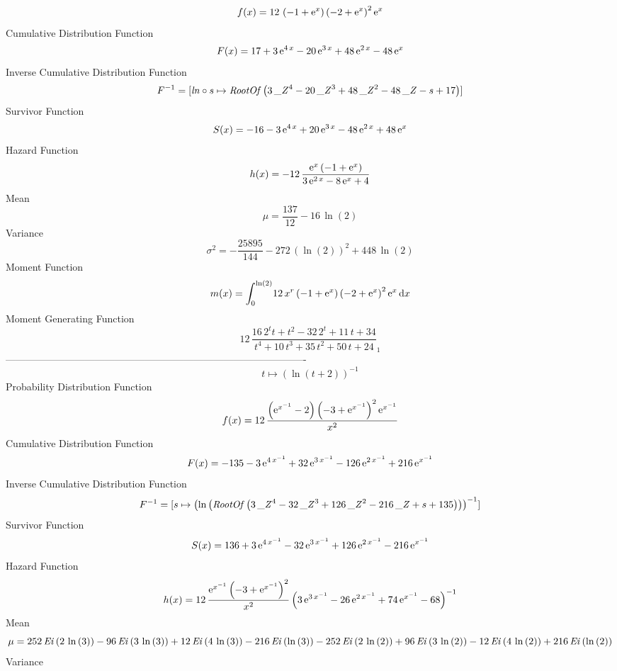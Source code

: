 \documentclass[12pt]{article}
\begin{document}
$$  f(x)=12\, \left( -1+{{\rm e}^{x}} \right)  \left( -2+{{\rm e}^{x}} \right) 
^{2}{{\rm e}^{x}}
$$Cumulative Distribution Function  
 $$F(x)=17+3\,{{\rm e}^{4\,x}}-20\,{{\rm e}^{3\,x}}+48\,{{\rm e}^{2\,x}}-48\,{
{\rm e}^{x}}
$$ Inverse Cumulative Distribution Function 
  $$F^{-1} = [{\it ln}\circ s\mapsto {\it RootOf} \left( 3\,{{\it \_Z}}^{4}-20\,{{
\it \_Z}}^{3}+48\,{{\it \_Z}}^{2}-48\,{\it \_Z}-s+17 \right) ]
$$Survivor Function 
 $$ S(x)=-16-3\,{{\rm e}^{4\,x}}+20\,{{\rm e}^{3\,x}}-48\,{{\rm e}^{2\,x}}+48\,
{{\rm e}^{x}}
$$ Hazard Function 
 $$ h(x)=-12\,{\frac {{{\rm e}^{x}} \left( -1+{{\rm e}^{x}} \right) }{3\,{
{\rm e}^{2\,x}}-8\,{{\rm e}^{x}}+4}}
$$Mean 
 $$ \mu={\frac{137}{12}}-16\,\ln  \left( 2 \right) 
$$ Variance 
 $$ \sigma^2 = -{\frac{25895}{144}}-272\, \left( \ln  \left( 2 \right)  \right) ^{2}+
448\,\ln  \left( 2 \right) 
$$Moment Function 
 $$ m(x) = \int_{0}^{\ln  \left( 2 \right) }\!12\,{x}^{r} \left( -1+{{\rm e}^{x}}
 \right)  \left( -2+{{\rm e}^{x}} \right) ^{2}{{\rm e}^{x}}\,{\rm d}x
$$ Moment Generating Function 
 $$12\,{\frac {16\,{2}^{t}t+{t}^{2}-32\,{2}^{t}+11\,t+34}{{t}^{4}+10\,{t}
^{3}+35\,{t}^{2}+50\,t+24}}_{{1}}
$$-------------------------------------------------------------------------------------------  \\$$t\mapsto  \left( \ln  \left( t+2 \right)  \right) ^{-1}
$$Probability Distribution Function 
$$  f(x)=12\,{\frac { \left( {{\rm e}^{{x}^{-1}}}-2 \right)  \left( -3+{{\rm e}
^{{x}^{-1}}} \right) ^{2}{{\rm e}^{{x}^{-1}}}}{{x}^{2}}}
$$Cumulative Distribution Function  
 $$F(x)=-135-3\,{{\rm e}^{4\,{x}^{-1}}}+32\,{{\rm e}^{3\,{x}^{-1}}}-126\,{
{\rm e}^{2\,{x}^{-1}}}+216\,{{\rm e}^{{x}^{-1}}}
$$ Inverse Cumulative Distribution Function 
  $$F^{-1} = [s\mapsto  \left( \ln  \left( {\it RootOf} \left( 3\,{{\it \_Z}}^{4}-
32\,{{\it \_Z}}^{3}+126\,{{\it \_Z}}^{2}-216\,{\it \_Z}+s+135 \right) 
 \right)  \right) ^{-1}]
$$Survivor Function 
 $$ S(x)=136+3\,{{\rm e}^{4\,{x}^{-1}}}-32\,{{\rm e}^{3\,{x}^{-1}}}+126\,{
{\rm e}^{2\,{x}^{-1}}}-216\,{{\rm e}^{{x}^{-1}}}
$$ Hazard Function 
 $$ h(x)=12\,{\frac {{{\rm e}^{{x}^{-1}}} \left( -3+{{\rm e}^{{x}^{-1}}}
 \right) ^{2}}{{x}^{2}} \left( 3\,{{\rm e}^{3\,{x}^{-1}}}-26\,{{\rm e}
^{2\,{x}^{-1}}}+74\,{{\rm e}^{{x}^{-1}}}-68 \right) ^{-1}}
$$Mean 
 $$ \mu=252\,{\it Ei} \left( 2\,\ln  \left( 3 \right)  \right) -96\,{\it Ei}
 \left( 3\,\ln  \left( 3 \right)  \right) +12\,{\it Ei} \left( 4\,\ln 
 \left( 3 \right)  \right) -216\,{\it Ei} \left( \ln  \left( 3
 \right)  \right) -252\,{\it Ei} \left( 2\,\ln  \left( 2 \right) 
 \right) +96\,{\it Ei} \left( 3\,\ln  \left( 2 \right)  \right) -12\,{
\it Ei} \left( 4\,\ln  \left( 2 \right)  \right) +216\,{\it Ei}
 \left( \ln  \left( 2 \right)  \right) 
$$ Variance 
\end{document}
